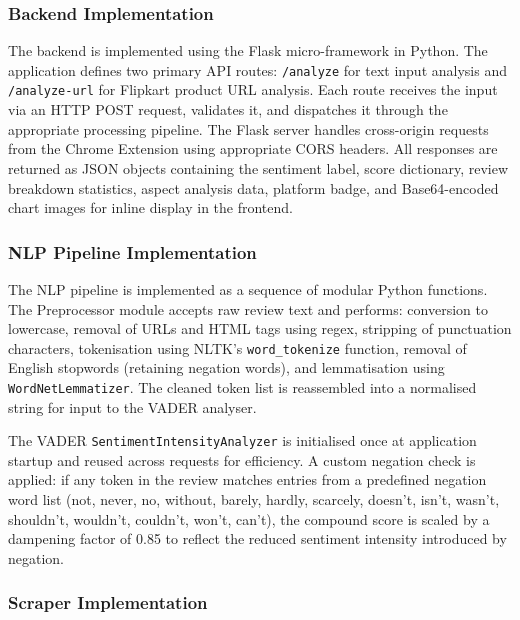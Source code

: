 \documentclass[12pt,a4paper]{report}
\begin{document}
\subsubsection*{Backend Implementation}

The backend is implemented using the Flask micro-framework in Python. The application defines two primary API routes: \texttt{/analyze} for text input analysis and \texttt{/analyze-url} for Flipkart product URL analysis. Each route receives the input via an HTTP POST request, validates it, and dispatches it through the appropriate processing pipeline. The Flask server handles cross-origin requests from the Chrome Extension using appropriate CORS headers. All responses are returned as JSON objects containing the sentiment label, score dictionary, review breakdown statistics, aspect analysis data, platform badge, and Base64-encoded chart images for inline display in the frontend.

\subsubsection*{NLP Pipeline Implementation}

The NLP pipeline is implemented as a sequence of modular Python functions. The Preprocessor module accepts raw review text and performs: conversion to lowercase, removal of URLs and HTML tags using regex, stripping of punctuation characters, tokenisation using NLTK's \texttt{word\_tokenize} function, removal of English stopwords (retaining negation words), and lemmatisation using \texttt{WordNetLemmatizer}. The cleaned token list is reassembled into a normalised string for input to the VADER analyser.

The VADER \texttt{SentimentIntensityAnalyzer} is initialised once at application startup and reused across requests for efficiency. A custom negation check is applied: if any token in the review matches entries from a predefined negation word list (not, never, no, without, barely, hardly, scarcely, doesn't, isn't, wasn't, shouldn't, wouldn't, couldn't, won't, can't), the compound score is scaled by a dampening factor of 0.85 to reflect the reduced sentiment intensity introduced by negation.

\subsubsection*{Scraper Implementation}
\end{document}
